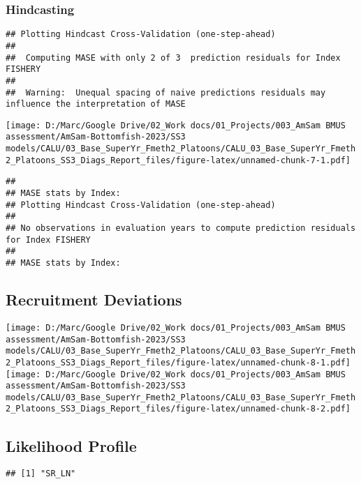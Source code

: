 \documentclass[
]{article}
\begin{document}
\hypertarget{hindcasting}{%
\subsubsection{Hindcasting}\label{hindcasting}}

\begin{verbatim}
## Plotting Hindcast Cross-Validation (one-step-ahead) 
## 
##  Computing MASE with only 2 of 3  prediction residuals for Index FISHERY 
## 
##  Warning:  Unequal spacing of naive predictions residuals may influence the interpretation of MASE
\end{verbatim}

\texttt{[image: D:/Marc/Google Drive/02\_Work docs/01\_Projects/003\_AmSam BMUS assessment/AmSam-Bottomfish-2023/SS3 models/CALU/03\_Base\_SuperYr\_Fmeth2\_Platoons/CALU\_03\_Base\_SuperYr\_Fmeth2\_Platoons\_SS3\_Diags\_Report\_files/figure-latex/unnamed-chunk-7-1.pdf]}

\begin{verbatim}
## 
## MASE stats by Index:
## Plotting Hindcast Cross-Validation (one-step-ahead) 
## 
## No observations in evaluation years to compute prediction residuals for Index FISHERY 
## 
## MASE stats by Index:
\end{verbatim}

\hypertarget{recruitment-deviations}{%
\subsection{Recruitment Deviations}\label{recruitment-deviations}}

\texttt{[image: D:/Marc/Google Drive/02\_Work docs/01\_Projects/003\_AmSam BMUS assessment/AmSam-Bottomfish-2023/SS3 models/CALU/03\_Base\_SuperYr\_Fmeth2\_Platoons/CALU\_03\_Base\_SuperYr\_Fmeth2\_Platoons\_SS3\_Diags\_Report\_files/figure-latex/unnamed-chunk-8-1.pdf]}
\texttt{[image: D:/Marc/Google Drive/02\_Work docs/01\_Projects/003\_AmSam BMUS assessment/AmSam-Bottomfish-2023/SS3 models/CALU/03\_Base\_SuperYr\_Fmeth2\_Platoons/CALU\_03\_Base\_SuperYr\_Fmeth2\_Platoons\_SS3\_Diags\_Report\_files/figure-latex/unnamed-chunk-8-2.pdf]}

\hypertarget{likelihood-profile}{%
\subsection{Likelihood Profile}\label{likelihood-profile}}

\begin{verbatim}
## [1] "SR_LN"
\end{verbatim}
\end{document}
